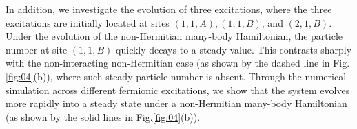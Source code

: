 \documentclass[longbibliography, aps, prx, amsmath, amssymb, amsfonts, twocolumn,superscriptaddress, footinbib]{revtex4-1}
\begin{document}
	In addition, we investigate the evolution of three excitations, where the three excitations are initially located at sites $(1,1,A), (1,1,B)$, and $(2,1,B)$. 
	Under the evolution of the non-Hermitian many-body Hamiltonian, the particle number at site $(1,1,B)$ quickly decays to a steady value.
	This contrasts sharply with the non-interacting non-Hermitian case (as shown by the dashed line in Fig.\ref{fig:04}(b)), where such steady particle number is absent.
	Through the numerical simulation across different fermionic excitations, we show that the system evolves more rapidly into a steady state under a non-Hermitian many-body Hamiltonian (as shown by the solid lines in Fig.\ref{fig:04}(b)). 

\end{document}
